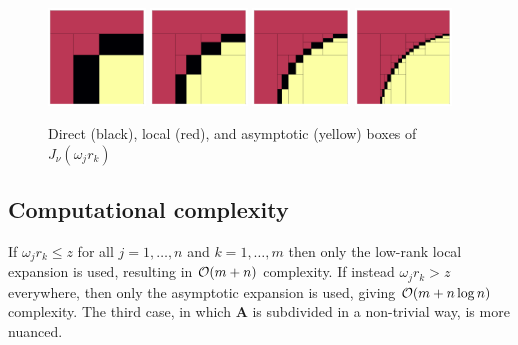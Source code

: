 \begin{figure}
    \centering
    \includegraphics[width=0.23\textwidth]{./figures/nufht_boxes_lvl1.pdf}
    \hfill
    \includegraphics[width=0.23\textwidth]{./figures/nufht_boxes_lvl2.pdf}
    \hfill
    \includegraphics[width=0.23\textwidth]{./figures/nufht_boxes_lvl3.pdf}
    \hfill
    \includegraphics[width=0.23\textwidth]{./figures/nufht_boxes_lvl4.pdf}
    \caption{Direct (black), local (red), and asymptotic (yellow) boxes of
    $J_\nu(\omega_j r_k)$}
\end{figure}

\subsection{Computational complexity}

If $\omega_j r_k \leq z$ for all $j=1,\dots,n$ and $k=1,\dots,m$ then only the
low-rank local expansion is used, resulting in $\mathcal{O}(m + n)$ complexity. If
instead $\omega_j r_k > z$ everywhere, then only the asymptotic expansion is
used, giving $\mathcal{O}(m + n\log n)$ complexity. The third case, in which $\bm{A}$ is
subdivided in a non-trivial way, is more nuanced. 